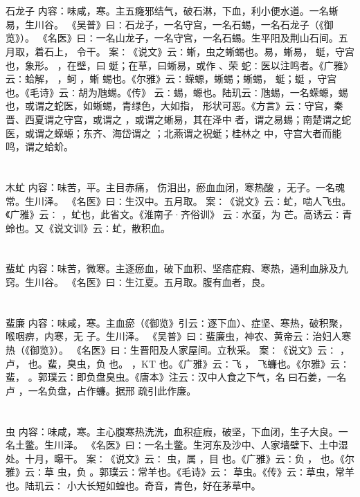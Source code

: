 \documentclass[12pt,UTF8]{ctexbook}
\begin{document}
\chapter{}石龙子
内容：味咸，寒。主五癃邪结气，破石淋，下血，利小便水道。一名蜥易，生川谷。 
《吴普》曰∶石龙子，一名守宫，一名石蜴，一名石龙子（《御览》）。 
《名医》曰∶一名山龙子，一名守宫，一名石蜴。生平阳及荆山石间。五月取，着石上， 
令干。 
案∶《说文》云∶蜥，虫之蜥蜴也。易，蜥易， 蜓，守宫也，象形。 ，在壁，曰 
蜓；在草，曰蜥易，或作 、荣 蛇∶医以注鸣者。《广雅》云∶蛤解， ，蚵 ，蜥 
蜴也。《尔雅》云∶蝾螈，蜥蜴；蜥蜴， 蜓；蜓 ，守宫也。《毛诗》云∶胡为虺蜴。《传》 
云∶蜴，螈也。陆玑云∶虺蜴，一名蝾螈，蜴也，或谓之蛇医，如蜥蜴，青绿色，大如指， 
形状可恶。《方言》云∶守宫，秦晋、西夏谓之守宫，或谓之 ，或谓之蜥易，其在泽中 
者，谓之易蜴；南楚谓之蛇医，或谓之蝾螈；东齐、海岱谓之 ；北燕谓之祝蜓；桂林之 
中，守宫大者而能鸣，谓之蛤蚧。 


\chapter{}木虻
内容：味苦，平。主目赤痛， 伤泪出，瘀血血闭，寒热酸 ，无子。一名魂常。生川泽。 
《名医》曰∶生汉中。五月取。 
案∶《说文》云∶虻，啮人飞虫。《广雅》云∶ ，虻也，此省文。《淮南子·齐俗训》 
云∶水虿，为 芒。高诱云∶青蛉也。又《说文训》云∶虻，散积血。 


\chapter{}蜚虻
内容：味苦，微寒。主逐瘀血，破下血积、坚痞症瘕、寒热，通利血脉及九窍。生川谷。 
《名医》曰∶生江夏。五月取。腹有血者，良。 


\chapter{}蜚廉
内容：味咸，寒。主血瘀（《御览》引云∶逐下血）、症坚、寒热，破积聚，喉咽痹，内寒，无 
子。生川泽。 
《吴普》曰∶蜚廉虫，神农、黄帝云∶治妇人寒热（《御览》）。 
《名医》曰∶生晋阳及人家屋间。立秋采。 
案∶《说文》云∶ ，卢， 也。蜚，臭虫，负 也。 ，KT 也。《广雅》云∶飞 
， 
飞蠊也。《尔雅》云∶蜚， 。郭璞云∶即负盘臭虫。《唐本》注云∶汉中人食之下气，名 
曰石姜，一名卢 ，一名负盘，占作蠊。据邢 疏引此作廉。 


\chapter{}虫
内容：味咸，寒。主心腹寒热洗洗，血积症瘕，破坚，下血闭，生子大良。一名土鳖。生川泽。 
《名医》曰∶一名土鳖。生河东及沙中、人家墙壁下、土中湿处。十月，曝干。 
案∶《说文》云∶ 虫，属 ，目 也。《广雅》云∶负 ， 也。《尔雅》云∶草 
虫，负 。郭璞云∶常羊也。《毛诗》云∶ 草虫。《传》云∶草虫，常羊也。陆玑云∶ 
小大长短如蝗也。奇音，青色，好在茅草中。 
\end{document}
